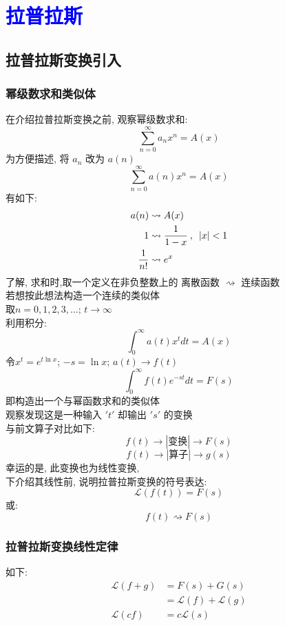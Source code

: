 \newpage

\section{\huge \textcolor{blue}{\hspace*{0.2em}拉普拉斯}}
\subsection{\LARGE \hspace*{0.1em}拉普拉斯变换引入}
\subsubsection{\large 幂级数求和类似体}
在介绍拉普拉斯变换之前, 观察幂级数求和:
\[ \sum_{n=0}^{\infty} a_n x^n = A(x) \]
为方便描述, 将 $a_n$ 改为 $a(n)$
\[ \sum_{n=0}^{\infty} a(n) x^n = A(x) \]
有如下:
\begin{align*}
   a(n) &\rightsquigarrow  A(x)  \\
    1   &\rightsquigarrow  \frac{1}{1-x} \hspace*{0.2em},\hspace*{0.5em} \left\lvert x\right\rvert < 1 \\
   \frac{1}{n!}  &\rightsquigarrow  e^{x}       
\end{align*}
了解, 求和时,取一个定义在非负整数上的
离散函数 $\rightsquigarrow$ 连续函数\\
若想按此想法构造一个连续的类似体\\
取$n = 0, 1, 2, 3, ...$;  $t \to \infty $\\
利用积分:
\[ \int_0^\infty a(t) x^t dt = A(x) \]
令$x^t = e^{t\ln x}$; $- s = \ln x$; $a(t) \to f(t)$
\[\int_0^\infty f(t) e^{-st} dt = F(s) \]
即构造出一个与幂函数求和的类似体\\
观察发现这是一种输入 $'t'$ 却输出 $'s'$ 的变换\\[2em]
与前文算子对比如下:
\[ f(t) \longrightarrow |\text{变换}| \longrightarrow F(s) \]
\[ f(t) \longrightarrow |\text{算子}| \longrightarrow g(s) \]
幸运的是, 此变换也为线性变换, \\
下介绍其线性前, 说明拉普拉斯变换的符号表达:
\[ \mathcal{L} (f(t)) = F(s) \]
或:
\[ f(t) \rightsquigarrow F(s) \]
\subsubsection{\large \hspace*{0.1em}拉普拉斯变换线性定律}
如下:
\begin{align*}
   \mathcal{L} (f + g) &= F(s) + G(s)  \\
                      &=  \mathcal{L}(f) + \mathcal{L}(g)  \\
   \mathcal{L}(c f)    &= c \mathcal{L}(s)       
\end{align*}
